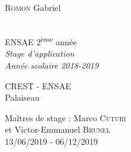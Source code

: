 \documentclass[12pt]{report}
\theoremstyle{definition}
\theoremstyle{remark}
\begin{document}
\thispagestyle{empty}
\noindent
\begin{minipage}{0.5\textwidth}
  \begin{flushleft} \Large
    \textsc{Romon} Gabriel\\
    \hfill\\
    \hfill
  \end{flushleft}
\end{minipage}
\noindent
\begin{minipage}{0.5\textwidth}
  \begin{flushright} 
  \Large
    ENSAE 2\textsuperscript{ème} année\\
    \textit{Stage d'application}\\
    \textit{Année scolaire 2018-2019}
  \end{flushright}
\end{minipage}

 \vspace*{5cm}

\begin{center}
\end{center}

\vfill
\noindent
\begin{minipage}{0.5\textwidth}
  \begin{flushleft} \Large
    CREST - ENSAE\\
    Palaiseau\\
    \hfill
  \end{flushleft}
\end{minipage}
\noindent
\begin{minipage}{0.5\textwidth}
  \begin{flushright} \Large
    Maîtres de stage : Marco \textsc{Cuturi}\\
    et Victor-Emmanuel \textsc{Brunel}\\
    13/06/2019 - 06/12/2019
  \end{flushright}
\end{minipage} 
\end{document}
